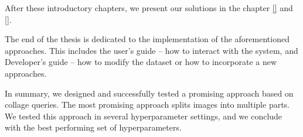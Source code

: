 After these introductory chapters, we present our solutions in the chapter \ref{} and \ref{}.

The end of the thesis is dedicated to the implementation of the aforementioned approaches. This includes the user's guide -- how to interact with the system, and Developer's guide -- how to modify the dataset or how to incorporate a new approaches.

\bigskip
In summary, we designed and successfully tested a promising approach based on collage queries. The most promising approach splits images into multiple parts. We tested this approach in several hyperparameter settings, and we conclude with the best performing set of hyperparameters. 




